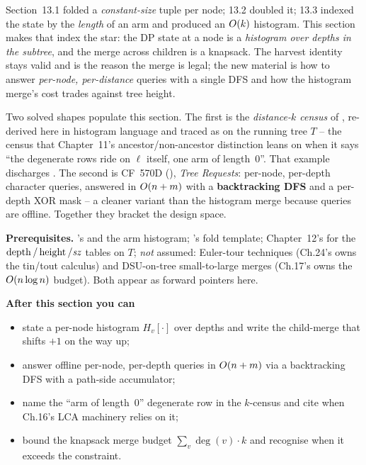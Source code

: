 \begin{topicintro}
Section~13.1 folded a \emph{constant-size} tuple per node; 13.2 doubled it;
13.3 indexed the state by the \emph{length} of an arm and produced an
$O(k)$ histogram. This section makes that index the star: the DP state
at a node is a \emph{histogram over depths in the subtree}, and the merge
across children is a knapsack. The  harvest identity
stays valid and is the reason the merge is legal; the new material is how
to answer \emph{per-node, per-distance} queries with a single DFS and how
the histogram merge's cost trades against tree height.

Two solved shapes populate this section. The first is the
\emph{distance-$k$ census} of , re-derived here in
histogram language and traced as  on the running tree $T$
-- the census that Chapter~11's  ancestor/non-ancestor
distinction leans on when it says ``the degenerate rows ride on $\ell$
itself, one arm of length~$0$''. That example discharges
. The second is CF~570D (),
\emph{Tree Requests}: per-node, per-depth character queries, answered in
$O(n+m)$ with a \textbf{backtracking DFS} and a per-depth XOR mask --
a cleaner variant than the histogram merge because queries are offline.
Together they bracket the design space.

\textbf{Prerequisites.} 's  and
the arm histogram; 's fold template; Chapter~12's
 for the $\operatorname{depth}/\operatorname{height}/\mathit{sz}$ tables on $T$;
\emph{not} assumed: Euler-tour techniques (Ch.24's  owns the
tin/tout calculus) and DSU-on-tree small-to-large merges (Ch.17's
 owns the $O(n\log n)$ budget). Both appear as forward
pointers here.

\textbf{After this section you can}
\begin{itemize}[nosep]
  \item state a per-node histogram $\mathit{H}_v[\cdot]$ over depths and
        write the child-merge that shifts $+1$ on the way up; \hfill{}
  \item answer offline per-node, per-depth queries in $O(n+m)$ via a
        backtracking DFS with a path-side accumulator; \hfill{}
  \item name the ``arm of length~$0$'' degenerate row in the $k$-census
        and cite  when Ch.16's LCA machinery relies on it;
        \hfill{}
  \item bound the knapsack merge budget $\sum_v \deg(v)\cdot k$ and
        recognise when it exceeds the constraint. \hfill{}
\end{itemize}
\end{topicintro}

